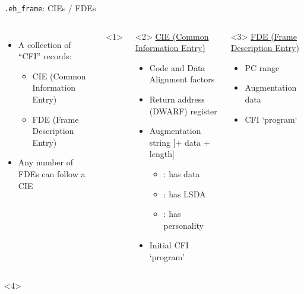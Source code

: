 \begin{frame}{\texttt{.eh\_frame}: CIEs / FDEs}
  \begin{columns}
    \begin{itemize}
    \item A collection of ``CFI'' records:
      \begin{itemize}
      \item CIE (Common Information Entry)
      \item FDE (Frame Description Entry)
      \end{itemize}
      \bigskip

    \item Any number of FDEs can follow a CIE
    \end{itemize}

    \begin{onlyenv}<1>
      \resizebox{\columnwidth}{!}{}
    \end{onlyenv}

    \begin{onlyenv}<2>
      \underline{CIE (Common Information Entry)}\\[1ex]
      \begin{itemize}
      \item Code and Data Alignment factors
      \item Return address (DWARF) register
      \item \alert{Augmentation string} [+ data + length]
        \begin{itemize}
        \item {}: has data
        \item {}: has LSDA
        \item {}: has personality
        \end{itemize}

      \item Initial CFI `program'
      \end{itemize}
    \end{onlyenv}

    \begin{onlyenv}<3>
      \underline{FDE (Frame Description Entry)}\\[1ex]
      \begin{itemize}
      \item PC range
      \item Augmentation data
      \item CFI `program`
      \end{itemize}
    \end{onlyenv}
  \end{columns}

  \begin{onlyenv}<4>
    \overlayLayer{\resizebox{0.54\textwidth}{!}{}}
  \end{onlyenv}
\end{frame}

